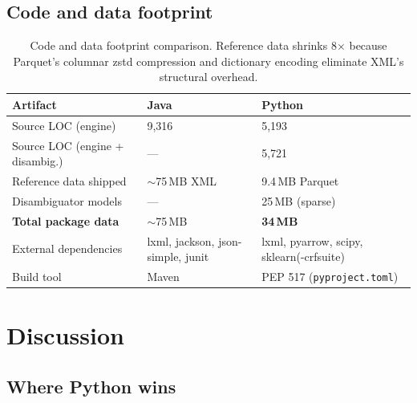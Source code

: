 \documentclass[11pt,a4paper]{article}
\begin{document}
\subsection{Code and data footprint}

\begin{table}[h]
\centering
\small
\begin{tabular}{lp{4.0cm}p{5.5cm}}
\toprule
\textbf{Artifact} & \textbf{Java} & \textbf{Python} \\
\midrule
Source LOC (engine) & 9{,}316 & 5{,}193 \\
Source LOC (engine + disambig.) & --- & 5{,}721 \\
Reference data shipped & $\sim$75\,MB XML & 9.4\,MB Parquet \\
Disambiguator models & --- & 25\,MB (sparse) \\
\textbf{Total package data} & $\sim$75\,MB & \textbf{34\,MB} \\
External dependencies & lxml, jackson, json-simple, junit & lxml, pyarrow, scipy, sklearn(-crfsuite) \\
Build tool & Maven & PEP 517 (\texttt{pyproject.toml}) \\
\bottomrule
\end{tabular}
\caption{Code and data footprint comparison. Reference data shrinks 8$\times$
because Parquet's columnar zstd compression and dictionary encoding eliminate
XML's structural overhead.}
\label{tab:footprint}
\end{table}

\section{Discussion}

\subsection{Where Python wins}
\end{document}
